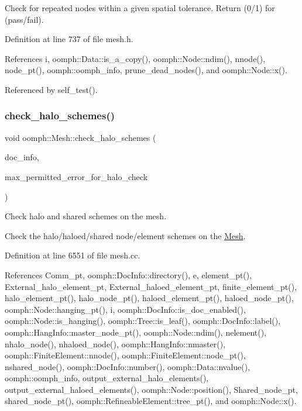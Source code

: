 Check for repeated nodes within a given spatial tolerance. Return (0/1) for (pass/fail). 



Definition at line 737 of file mesh.\+h.



References i, oomph\+::\+Data\+::is\+\_\+a\+\_\+copy(), oomph\+::\+Node\+::ndim(), nnode(), node\+\_\+pt(), oomph\+::oomph\+\_\+info, prune\+\_\+dead\+\_\+nodes(), and oomph\+::\+Node\+::x().



Referenced by self\+\_\+test().

\mbox{\label{classoomph_1_1Mesh_a500ba96f32d090b15dbdbadcaef0e32a}} 
\subsubsection{\texorpdfstring{check\+\_\+halo\+\_\+schemes()}{check\_halo\_schemes()}}
{\footnotesize\ttfamily void oomph\+::\+Mesh\+::check\+\_\+halo\+\_\+schemes (\begin{DoxyParamCaption}\item[{\hyperlink{classoomph_1_1DocInfo}{Doc\+Info} \&}]{doc\+\_\+info,  }\item[{double \&}]{max\+\_\+permitted\+\_\+error\+\_\+for\+\_\+halo\+\_\+check }\end{DoxyParamCaption})}



Check halo and shared schemes on the mesh. 

Check the halo/haloed/shared node/element schemes on the \hyperlink{classoomph_1_1Mesh}{Mesh}. 

Definition at line 6551 of file mesh.\+cc.



References Comm\+\_\+pt, oomph\+::\+Doc\+Info\+::directory(), e, element\+\_\+pt(), External\+\_\+halo\+\_\+element\+\_\+pt, External\+\_\+haloed\+\_\+element\+\_\+pt, finite\+\_\+element\+\_\+pt(), halo\+\_\+element\+\_\+pt(), halo\+\_\+node\+\_\+pt(), haloed\+\_\+element\+\_\+pt(), haloed\+\_\+node\+\_\+pt(), oomph\+::\+Node\+::hanging\+\_\+pt(), i, oomph\+::\+Doc\+Info\+::is\+\_\+doc\+\_\+enabled(), oomph\+::\+Node\+::is\+\_\+hanging(), oomph\+::\+Tree\+::is\+\_\+leaf(), oomph\+::\+Doc\+Info\+::label(), oomph\+::\+Hang\+Info\+::master\+\_\+node\+\_\+pt(), oomph\+::\+Node\+::ndim(), nelement(), nhalo\+\_\+node(), nhaloed\+\_\+node(), oomph\+::\+Hang\+Info\+::nmaster(), oomph\+::\+Finite\+Element\+::nnode(), oomph\+::\+Finite\+Element\+::node\+\_\+pt(), nshared\+\_\+node(), oomph\+::\+Doc\+Info\+::number(), oomph\+::\+Data\+::nvalue(), oomph\+::oomph\+\_\+info, output\+\_\+external\+\_\+halo\+\_\+elements(), output\+\_\+external\+\_\+haloed\+\_\+elements(), oomph\+::\+Node\+::position(), Shared\+\_\+node\+\_\+pt, shared\+\_\+node\+\_\+pt(), oomph\+::\+Refineable\+Element\+::tree\+\_\+pt(), and oomph\+::\+Node\+::x().




